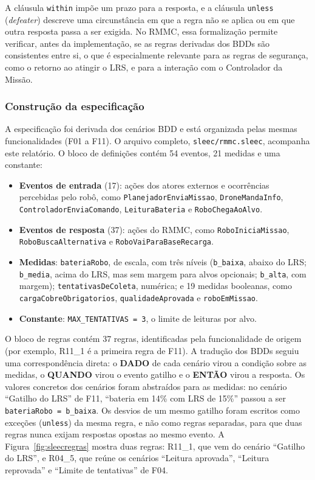 \documentclass[a4paper, 12pt]{article}
\begin{document}
A cláusula \texttt{within} impõe um prazo para a resposta, e a cláusula \texttt{unless} (\textit{defeater}) descreve uma circunstância em que a regra não se aplica ou em que outra resposta passa a ser exigida. No RMMC, essa formalização permite verificar, antes da implementação, se as regras derivadas dos BDDs são consistentes entre si, o que é especialmente relevante para as regras de segurança, como o retorno ao atingir o LRS, e para a interação com o Controlador da Missão.

\Needspace{6cm}
\subsubsection{Construção da especificação}

A especificação foi derivada dos cenários BDD e está organizada pelas mesmas funcionalidades (F01 a F11). O arquivo completo, \texttt{sleec/rmmc.sleec}, acompanha este relatório. O bloco de definições contém 54 eventos, 21 medidas e uma constante:

\begin{itemize}
  \item \textbf{Eventos de entrada} (17): ações dos atores externos e ocorrências percebidas pelo robô, como \texttt{PlanejadorEnviaMissao}, \texttt{DroneMandaInfo}, \texttt{ControladorEnviaComando}, \texttt{LeituraBateria} e \texttt{RoboChegaAoAlvo}.
  \item \textbf{Eventos de resposta} (37): ações do RMMC, como \texttt{RoboIniciaMissao}, \texttt{RoboBuscaAlternativa} e \texttt{RoboVaiParaBaseRecarga}.
  \item \textbf{Medidas}: \texttt{bateriaRobo}, de escala, com três níveis (\texttt{b\_baixa}, abaixo do LRS; \texttt{b\_media}, acima do LRS, mas sem margem para alvos opcionais; \texttt{b\_alta}, com margem); \texttt{tentativasDeColeta}, numérica; e 19 medidas booleanas, como \texttt{cargaCobreObrigatorios}, \texttt{qualidadeAprovada} e \texttt{roboEmMissao}.
  \item \textbf{Constante}: \texttt{MAX\_TENTATIVAS = 3}, o limite de leituras por alvo.
\end{itemize}

O bloco de regras contém 37 regras, identificadas pela funcionalidade de origem (por exemplo, R11\_1 é a primeira regra de F11). A tradução dos BDDs seguiu uma correspondência direta: o \textbf{DADO} de cada cenário virou a condição sobre as medidas, o \textbf{QUANDO} virou o evento gatilho e o \textbf{ENTÃO} virou a resposta. Os valores concretos dos cenários foram abstraídos para as medidas: no cenário ``Gatilho do LRS'' de F11, ``bateria em 14\% com LRS de 15\%'' passou a ser \texttt{bateriaRobo = b\_baixa}. Os desvios de um mesmo gatilho foram escritos como exceções (\texttt{unless}) da mesma regra, e não como regras separadas, para que duas regras nunca exijam respostas opostas ao mesmo evento. A Figura~\ref{fig:sleecregras} mostra duas regras: R11\_1, que vem do cenário ``Gatilho do LRS'', e R04\_5, que reúne os cenários ``Leitura aprovada'', ``Leitura reprovada'' e ``Limite de tentativas'' de F04.
\end{document}
